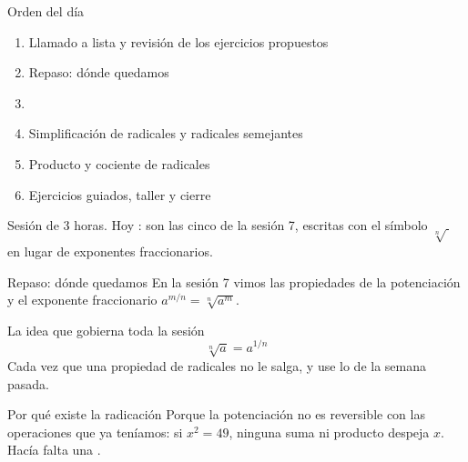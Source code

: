 \documentclass[aspectratio=169,10pt]{beamer}
\begin{document}
\portada

\begin{frame}{Orden del día}
  \begin{enumerate}
    \item Llamado a lista y revisión de los ejercicios propuestos
    \item Repaso: dónde quedamos
    \item {}
    \item Simplificación de radicales y radicales semejantes
    \item Producto y cociente de radicales
    \item Ejercicios guiados, taller y cierre
  \end{enumerate}

  \vspace{0.25cm}
  {\footnotesize\color{uniGris} Sesión de 3 horas. Hoy : son las cinco de la sesión 7, escritas con el símbolo
  $\sqrt[n]{\ }$ en lugar de exponentes fraccionarios.}
\end{frame}

\begin{frame}{Repaso: dónde quedamos}
  \footnotesize
  En la sesión 7 vimos las propiedades de la potenciación y el exponente
  fraccionario $a^{m/n} = \sqrt[n]{a^{m}}$.

  \vspace{0.2cm}
  \begin{alertblock}{La idea que gobierna toda la sesión}
    \footnotesize
    \[ \sqrt[n]{a} = a^{1/n} \]
     Cada vez que
    una propiedad de radicales no le salga,  y use lo de la semana pasada.
  \end{alertblock}

  \vspace{0.2cm}
  \begin{block}{Por qué existe la radicación}
    \footnotesize
    Porque la potenciación no es reversible con las operaciones que ya
    teníamos: si $x^2 = 49$, ninguna suma ni producto despeja $x$. Hacía falta
    una .
  \end{block}
\end{frame}

\end{document}
